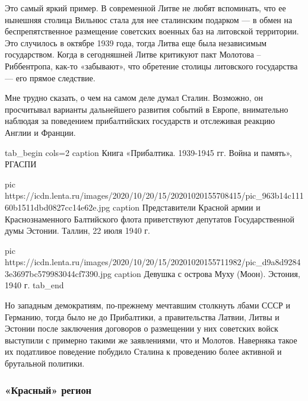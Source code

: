 
Это самый яркий пример. В современной Литве не любят вспоминать, что ее
нынешняя столица Вильнюс стала для нее сталинским подарком — в обмен на
беспрепятственное размещение советских военных баз на литовской территории. Это
случилось в октябре 1939 года, тогда Литва еще была независимым государством.
Когда в сегодняшней Литве критикуют пакт Молотова – Риббентропа, как-то
«забывают», что обретение столицы литовского государства — его прямое
следствие.


Мне трудно сказать, о чем на самом деле думал Сталин. Возможно, он просчитывал
варианты дальнейшего развития событий в Европе, внимательно наблюдая за
поведением прибалтийских государств и отслеживая реакцию Англии и Франции.

\ifcmt
tab_begin cols=2
	caption Книга «Прибалтика. 1939-1945 гг. Война и память», РГАСПИ

	pic https://icdn.lenta.ru/images/2020/10/20/15/20201020155708415/pic_963b14c11160b1511dbd0827cc14e62e.jpg
	caption Представители Красной армии и Краснознаменного Балтийского флота приветствуют депутатов Государственной думы Эстонии. Таллин, 22 июля 1940 г.

	pic https://icdn.lenta.ru/images/2020/10/20/15/20201020155711982/pic_d9a8d92843e3697bc579983044cf7390.jpg
	caption Девушка с острова Муху (Моон). Эстония, 1940 г. 
tab_end
\fi

Но западным демократиям, по-прежнему мечтавшим столкнуть лбами СССР и Германию,
тогда было не до Прибалтики, а правительства Латвии, Литвы и Эстонии после
заключения договоров о размещении у них советских войск выступили с примерно
такими же заявлениями, что и Молотов. Наверняка такое их податливое поведение
побудило Сталина к проведению более активной и брутальной политики.

\subsubsection{«Красный» регион}

